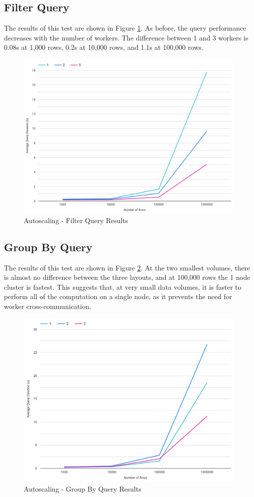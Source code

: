 \subsection{Filter Query}
The results of this test are shown in Figure \ref{fig:filter-simple-autoscale-test}. As before, the query performance decreases with the number of workers. The difference between 1 and 3 workers is 0.08s at 1,000 rows, 0.2s at 10,000 rows, and 1.1s at 100,000 rows.

\begin{figure}[ht]
	\centering
	\includegraphics[width=0.8\linewidth]{chapters/diagrams/testing/filter-simple-autoscale-test}
	\caption{Autoscaling - Filter Query Results}
	\label{fig:filter-simple-autoscale-test}
\end{figure}

\subsection{Group By Query}
The results of this test are shown in Figure \ref{fig:group-by-simple-autoscale-test}. At the two smallest volumes, there is almost no difference between the three layouts, and at 100,000 rows the 1 node cluster is fastest. This suggests that, at very small data volumes, it is faster to perform all of the computation on a single node, as it prevents the need for worker cross-communication.

\begin{figure}[ht]
	\centering
	\includegraphics[width=0.8\linewidth]{chapters/diagrams/testing/group-by-simple-autoscale-test}
	\caption{Autoscaling - Group By Query Results}
	\label{fig:group-by-simple-autoscale-test}
\end{figure}

